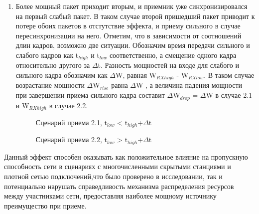 \documentclass{llncs}
\begin{document}
\begin{enumerate}
\item Более мощный пакет приходит вторым, и приемник уже синхронизировался на первый слабый пакет. В таком случае второй пришедший пакет приводит к потере обоих пакетов в отстутствие эффекта, и приему сильного в случае пересинхронизации на него. Отметим, что в зависимости от соотношений  длин кадров, возможно две ситуации. Обозначим время передачи сильного и слабого кадров как t$_{high}$ и t$_{low}$ соответственно, а смещение одного кадра относительно другого за $\Delta$t. Разность мощностей на входе для слабого и сильного кадра обозначим как $\Delta$W, равная W$_{RX high}$ - W$_{RX low}$. В таком случае возрастание мощности $\Delta$W$_{rise}$  равна $\Delta$W , а величина падения мощности при завершении приема сильного кадра составит $\Delta$W$_{drop}$ = $\Delta$W в случае 2.1 и W$_{RX high}$ в случае 2.2.
\\
\begin{figure}[]
\caption{Сценарий приема 2.1, t$_{low}$ < t$_{high}$+$\Delta$t}
\label{ris:image}
\end{figure}
\begin{figure}[]
\caption{Сценарий приема 2.2, t$_{low}$ > t$_{high}$+$\Delta$t}
\label{ris:image}
\end{figure}

\end{enumerate}
Данный эффект способен оказывать как положительное влияние на пропускную способность сети в сценариях с многочисленными скрытыми станциями и плотной сетью подключений,что было проверено в исследовании\cite{Kureev2017}, так и потенциально нарушать справедливость механизма распределения ресурсов между участниками сети, предоставляя наиболее мощному источнику преимущество при приеме\cite{Bejerano2015}.  
\end{document}
